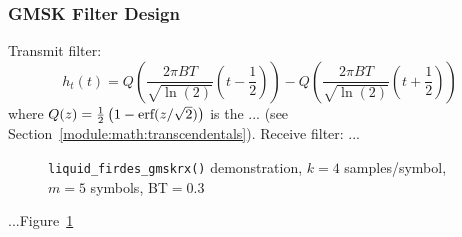 \subsubsection{GMSK Filter Design}
\label{module:filter:firdes_gmsk}

%
Transmit filter:
\[
    h_t(t) = Q\left( \frac{2 \pi BT}{\sqrt{\ln(2)}} \left(t-\frac{1}{2}\right) \right) -
             Q\left( \frac{2 \pi BT}{\sqrt{\ln(2)}} \left(t+\frac{1}{2}\right) \right)
\]
%
where $Q(z)=\frac{1}{2}\left(1 - \textup{erf}(z/\sqrt{2})\right)$
is the ... (see Section~\ref{module:math:transcendentals}).
%
Receive filter: ...
%
\begin{figure}
\centering
{}
\caption{{\tt liquid\_firdes\_gmskrx()} demonstration,
         $k=4$ samples/symbol, $m=5$ symbols, BT$=0.3$}
\label{fig:module:filter:firdes_gmskrx}
\end{figure}
%
...Figure~\ref{fig:module:filter:firdes_gmskrx}

